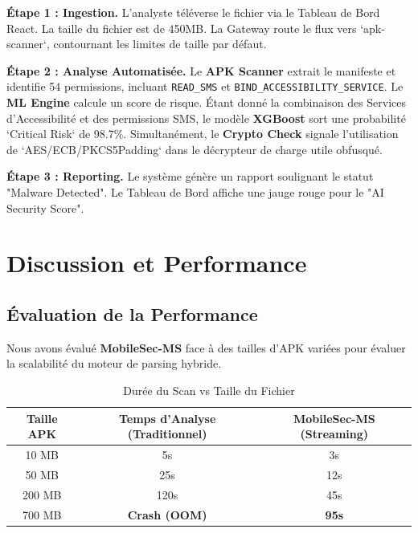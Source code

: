 \documentclass[
  journal=largetwo,
  manuscript=article-type,
  year=2025,
  volume=1,
]{cup-journal}
\begin{document}
\textbf{Étape 1 : Ingestion.} L'analyste téléverse le fichier via le Tableau de Bord React. La taille du fichier est de 450MB. La Gateway route le flux vers `apk-scanner`, contournant les limites de taille par défaut.

\textbf{Étape 2 : Analyse Automatisée.} Le \textbf{APK Scanner} extrait le manifeste et identifie 54 permissions, incluant \texttt{READ\_SMS} et \texttt{BIND\_ACCESSIBILITY\_SERVICE}. Le \textbf{ML Engine} calcule un score de risque. Étant donné la combinaison des Services d'Accessibilité et des permissions SMS, le modèle \textbf{XGBoost} sort une probabilité `Critical Risk` de 98.7\%. Simultanément, le \textbf{Crypto Check} signale l'utilisation de `AES/ECB/PKCS5Padding` dans le décrypteur de charge utile obfusqué.

\textbf{Étape 3 : Reporting.} Le système génère un rapport soulignant le statut "Malware Detected". Le Tableau de Bord affiche une jauge rouge pour le "AI Security Score".

\section{Discussion et Performance}
\label{sec:discussion}

\subsection{Évaluation de la Performance}
Nous avons évalué \textbf{MobileSec-MS} face à des tailles d'APK variées pour évaluer la scalabilité du moteur de parsing hybride.

\begin{table}[hbt!]
\centering
\caption{Durée du Scan vs Taille du Fichier}
\begin{tabular}{ccc}
\toprule
\textbf{Taille APK} & \textbf{Temps d'Analyse (Traditionnel)} & \textbf{MobileSec-MS (Streaming)} \\
\midrule
10 MB & 5s & 3s \\
50 MB & 25s & 12s \\
200 MB & 120s & 45s \\
700 MB & \textbf{Crash (OOM)} & \textbf{95s} \\
\bottomrule
\end{tabular}
\label{tab:perf}
\end{table}
\end{document}
